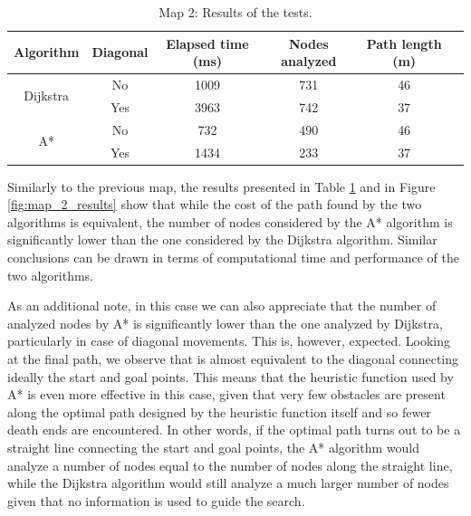\begin{table}[H]
    \centering
    \begin{tabular}{|c|c|c|c|c|c|}
        \hline
        \textbf{Algorithm}        & \textbf{Diagonal} & \textbf{Elapsed time (ms)} & \textbf{Nodes analyzed} & \textbf{Path length (m)} \\
        \hline
        \multirow{2}{*}{Dijkstra} & No                & 1009                       & 731                     & 46                       \\
                                  & Yes               & 3963                       & 742                     & 37                       \\
        \hline
        \multirow{2}{*}{A*}       & No                & 732                        & 490                     & 46                       \\
                                  & Yes               & 1434                       & 233                     & 37                       \\
        \hline
    \end{tabular}
    \caption{Map 2: Results of the tests.}
    \label{tab:map_2_results}
\end{table}

Similarly to the previous map, the results presented in Table \ref{tab:map_2_results} and in Figure \ref{fig:map_2_results} show that while the cost of the path found by the two algorithms is equivalent, the number of nodes considered by the A* algorithm is significantly lower than the one considered by the Dijkstra algorithm.
Similar conclusions can be drawn in terms of computational time and performance of the two algorithms.

As an additional note, in this case we can also appreciate that the number of analyzed nodes by A* is significantly lower than the one analyzed by Dijkstra, particularly in case of diagonal movements.
This is, however, expected.
Looking at the final path, we observe that is almost equivalent to the diagonal connecting ideally the start and goal points.
This means that the heuristic function used by A* is even more effective in this case, given that very few obstacles are present along the optimal path designed by the heuristic function itself and so fewer death ends are encountered.
In other words, if the optimal path turns out to be a straight line connecting the start and goal points, the A* algorithm would analyze a number of nodes equal to the number of nodes along the straight line, while the Dijkstra algorithm would still analyze a much larger number of nodes given that no information is used to guide the search.


